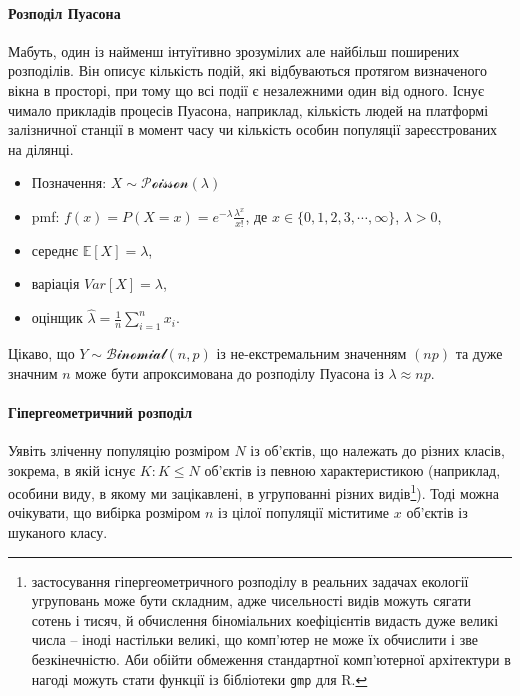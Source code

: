 \documentclass[
  11pt,
]{book}
\begin{document}
\paragraph{Розподіл Пуасона}\label{ux440ux43eux437ux43fux43eux434ux456ux43b-ux43fux443ux430ux441ux43eux43dux430}

Мабуть, один із найменш інтуїтивно зрозумілих але найбільш поширених розподілів. Він описує кількість подій, які відбуваються протягом визначеного вікна в просторі, при тому що всі події є незалежними один від одного. Існує чимало прикладів процесів Пуасона, наприклад, кількість людей на платформі залізничної станції в момент часу чи кількість особин популяції зареєстрованих на ділянці.

\begin{itemize}
\item
  Позначення: \(X \sim \mathcal{Poisson}(\lambda)\)
\item
  pmf: \(f(x) = P(X = x) = e^{-\lambda} \frac{\lambda^x}{x!}\), де \(x \in \{0, 1, 2, 3, \cdots, \infty \}\), \(\lambda > 0\),
\item
  середнє \(\mathbb{E} [X] = \lambda\),
\item
  варіація \(Var[X] = \lambda\),
\item
  оцінщик \(\hat{\lambda} = \frac{1}{n} \sum \limits_{i=1}^{n}x_i\).
\end{itemize}

Цікаво, що \(Y \sim \mathcal{Binomial}(n, p)\) із не-екстремальним значенням \((np)\) та дуже значним \(n\) може бути апроксимована до розподілу Пуасона із \(\lambda \approx np\).

\paragraph{Гіпергеометричний розподіл}\label{ux433ux456ux43fux435ux440ux433ux435ux43eux43cux435ux442ux440ux438ux447ux43dux438ux439-ux440ux43eux437ux43fux43eux434ux456ux43b}

Уявіть зліченну популяцію розміром \(N\) із об'єктів, що належать до різних класів, зокрема, в якій існує \(K: K \leq N\) об'єктів із певною характеристикою (наприклад, особини виду, в якому ми зацікавлені, в угрупованні різних видів\footnote{застосування гіпергеометричного розподілу в реальних задачах екології угруповань може бути складним, адже чисельності видів можуть сягати сотень і тисяч, й обчислення біноміальних коефіцієнтів видасть дуже великі числа -- іноді настільки великі, що комп'ютер не може їх обчислити і зве безкінечністю. Аби обійти обмеження стандартної комп'ютерної архітектури в нагоді можуть стати функції із бібліотеки \texttt{gmp} для R.}). Тоді можна очікувати, що вибірка розміром \(n\) із цілої популяції міститиме \(x\) об'єктів із шуканого класу.
\end{document}
